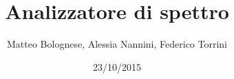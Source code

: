 \documentclass[12pt,a4paper]{article}
\begin{document}
 	\title{Analizzatore di spettro} \author{Matteo Bolognese, Alessia Nannini, Federico Torrini}
 	\date{23/10/2015}
 	\maketitle
\end{document}
